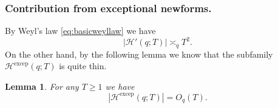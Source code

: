 \documentclass{article}
\newtheorem{lem}[thm]{Lemma}
\theoremstyle{named}
\newcommand{\HH}{\mathcal{H}}
\begin{document}
\subsubsection{Contribution from exceptional newforms.}
 By Weyl's law \eqref{eq:basicweyllaw} we have 
\begin{equation*}
    |\HH'(q; T)| \asymp_q T^2.
\end{equation*}
On the other hand, by the following lemma we know that the subfamily $\HH^{\text{excep}}(q; T)$ is quite thin.
\begin{lem}\label{lem:exceptionalnewformsaresparse}
For any $T \geq 1$ we have 
\begin{equation}\label{eq:boundexceptionalnewforms}
    |\HH^{\text{excep}}(q; T)| = O_q(T).
\end{equation}
\end{lem}
\end{document}
